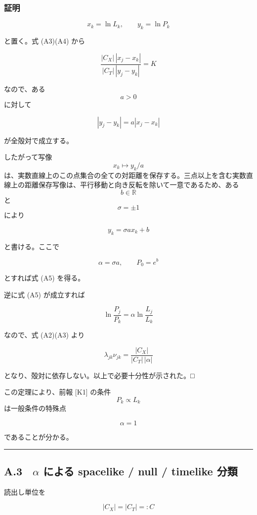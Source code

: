 \documentclass[
  a4paper,
]{ltjsarticle}
\begin{document}
\subsubsection{証明}\label{ux8a3cux660e}

\[
x_k=\ln L_k,
\qquad
y_k=\ln P_k
\]

と置く。式 (A3)(A4) から

\[
\frac{|C_X|\,|x_j-x_k|}
{|C_T|\,|y_j-y_k|}
=K
\]

なので、ある \[a>0\] に対して

\[
|y_j-y_k|
=
a|x_j-x_k|
\tag{A6}
\]

が全殻対で成立する。

したがって写像 \[x_k\mapsto y_k/a\]
は、実数直線上のこの点集合の全ての対距離を保存する。三点以上を含む実数直線上の距離保存写像は、平行移動と向き反転を除いて一意であるため、ある
\[b\in\mathbb R\] と \[\sigma=\pm1\] により

\[
y_k
=
\sigma a x_k+b
\tag{A7}
\]

と書ける。ここで

\[
\alpha=\sigma a,
\qquad
P_0=e^b
\]

とすれば式 (A5) を得る。

逆に式 (A5) が成立すれば

\[
\ln\frac{P_j}{P_k}
=
\alpha
\ln\frac{L_j}{L_k}
\]

なので、式 (A2)(A3) より

\[
\boxed{
\lambda_{jk}\nu_{jk}
=
\frac{|C_X|}{|C_T|\,|\alpha|}
}
\tag{A8}
\]

となり、殻対に依存しない。以上で必要十分性が示された。□

この定理により、前報 {[}K1{]} の条件 \[P_k\propto L_k\]
は一般条件の特殊点

\[
\boxed{\alpha=1}
\]

であることが分かる。

\begin{center}\rule{0.5\linewidth}{0.5pt}\end{center}

\subsection{\texorpdfstring{A.3　\(\alpha\) による spacelike / null /
timelike
分類}{A.3　\textbackslash alpha による spacelike / null / timelike 分類}}\label{a.3-alpha-ux306bux3088ux308b-spacelike-null-timelike-ux5206ux985e}

読出し単位を

\[
|C_X|=|C_T|=:C
\tag{A9}
\]
\end{document}

